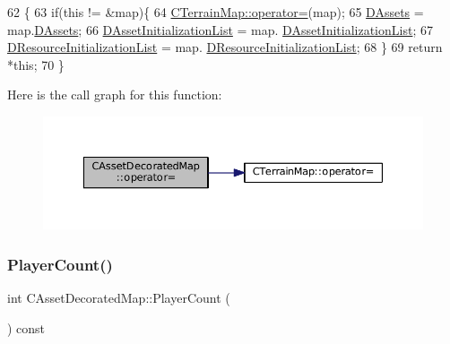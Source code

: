 \begin{DoxyCode}
62                                                                               \{
63     \textcolor{keywordflow}{if}(\textcolor{keyword}{this} != &map)\{
64         \hyperlink{classCTerrainMap_ad9f476d5d4db6de2907dfa3d4d9de7e6}{CTerrainMap::operator=}(map);
65         \hyperlink{classCAssetDecoratedMap_a94eeed5b16141169b1ba6cb3842055aa}{DAssets} = map.\hyperlink{classCAssetDecoratedMap_a94eeed5b16141169b1ba6cb3842055aa}{DAssets};
66         \hyperlink{classCAssetDecoratedMap_a2b7bf2e9a19a9173093cef32048608c2}{DAssetInitializationList} = map.
      \hyperlink{classCAssetDecoratedMap_a2b7bf2e9a19a9173093cef32048608c2}{DAssetInitializationList};
67         \hyperlink{classCAssetDecoratedMap_ab4c78aeb90280ea98a3aa542cdb7f8cc}{DResourceInitializationList} = map.
      \hyperlink{classCAssetDecoratedMap_ab4c78aeb90280ea98a3aa542cdb7f8cc}{DResourceInitializationList};
68     \}
69     \textcolor{keywordflow}{return} *\textcolor{keyword}{this};
70 \}
\end{DoxyCode}
Here is the call graph for this function\+:
\nopagebreak
\begin{figure}[H]
\begin{center}
\leavevmode
\includegraphics[width=350pt]{classCAssetDecoratedMap_a0330faaf18f597b5e2ebbbfcd8bf2819_cgraph}
\end{center}
\end{figure}
\hypertarget{classCAssetDecoratedMap_a1ead2938a9585fa82b5b5ef72efe6eba}{}\label{classCAssetDecoratedMap_a1ead2938a9585fa82b5b5ef72efe6eba} 
\subsubsection{\texorpdfstring{Player\+Count()}{PlayerCount()}}
{\footnotesize\ttfamily int C\+Asset\+Decorated\+Map\+::\+Player\+Count (\begin{DoxyParamCaption}{ }\end{DoxyParamCaption}) const\hspace{0.3cm}{\ttfamily [inline]}}



